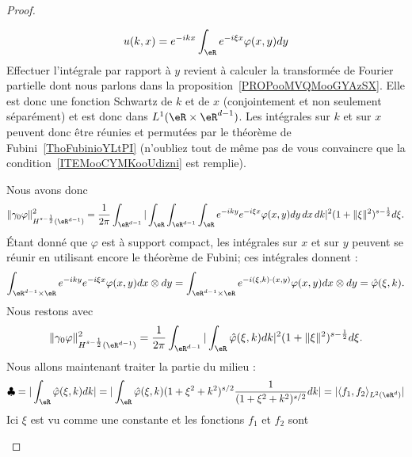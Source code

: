 \begin{proof}
\begin{subproof}
\begin{equation}
                u(k,x)= e^{-ikx}\int_{\eR} e^{-i\xi x}\varphi(x,y)dy
            \end{equation}
            Effectuer l'intégrale par rapport à $y$ revient à calculer la transformée de Fourier partielle dont nous parlons dans la proposition~\ref{PROPooMVQMooGYAzSX}. Elle est donc une fonction Schwartz de \( k\) et de \( x\) (conjointement et non seulement séparément) et est donc dans \( L^1(\eR\times \eR^{d-1})\). Les intégrales sur \( k \) et sur \( x\) peuvent donc être réunies et permutées par le théorème de Fubini~\ref{ThoFubinioYLtPI} (n'oubliez tout de même pas de vous convaincre que la condition~\ref{ITEMooCYMKooUdizni} est remplie).

            Nous avons donc
            \begin{equation}
                \| \gamma_0\varphi \|^2_{H^{s-\frac{ 1 }{2}}(\eR^{d-1})}=\frac{1}{ 2\pi }\int_{\eR^{d-1}}|\int_{\eR}\int_{\eR^{d-1}}\int_{\eR} e^{-iky} e^{-i\xi x}\varphi(x,y)dy\,dx\,dk|^2(1+\| \xi \|^2)^{s-\frac{ 1 }{2}}d\xi.
            \end{equation}
            Étant donné que \( \varphi\) est à support compact, les intégrales sur \( x\) et sur \( y\) peuvent se réunir en utilisant encore le théorème de Fubini; ces intégrales donnent :
            \begin{equation}
                \int_{\eR^{d-1}\times \eR} e^{-iky} e^{-i\xi x}\varphi(x,y)dx\otimes dy=\int_{\eR^{d-1}\times \eR} e^{  -i(\xi,k)\cdot(x,y)  }\varphi(x,y)dx\otimes dy=\hat \varphi(\xi,k).
            \end{equation}
            Nous restons avec
            \begin{equation}
                \| \gamma_0\varphi \|^2_{H^{s-\frac{ 1 }{2}}(\eR^{d-1})}=\frac{1}{ 2\pi }\int_{\eR^{d-1}}|   \int_{\eR}\hat \varphi(\xi,k)dk    |^2(1+\| \xi \|^2)^{s-\frac{ 1 }{2}}d\xi.
            \end{equation}
            Nous allons maintenant traiter la partie du milieu :
            \begin{equation}
                \clubsuit=|\int_{\eR}\hat \varphi(\xi,k)dk|=| \int_{\eR}\hat \varphi(\xi,k)(1+\xi^2+k^2)^{s/2}\frac{1}{ (1+\xi^2+k^2)^{s/2} }dk |=| \langle f_1, f_2\rangle_{L^2(\eR^d)} |
            \end{equation}
            Ici \( \xi\) est vu comme une constante et les fonctions \( f_1\) et \( f_2\) sont
            \begin{subequations}

\end{subequations}
\end{subproof}
\end{proof}
